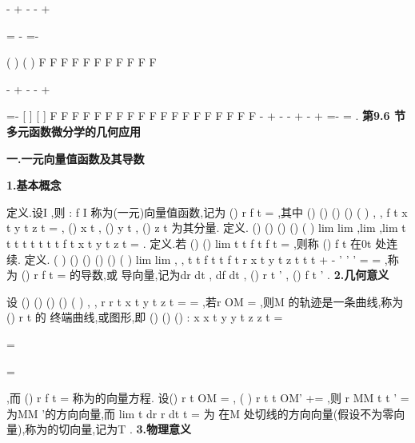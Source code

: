 \partial 
\partial 
-
+
-
-
+






\partial 
\partial 
\partial 
\partial 




=
-
=-


\partial \partial 
\partial 

(
)
(
)
F
F
F
F
F
F
F
F
F
F
F




-
+
\cdots 
-
-
+
\cdots 








=-
[
]
[
]
F F
F F F
F
F F
F F
F F
F F F
F F
F
F
-
+
-
-
+
-
+
=-
=
. 
\vspace{6pt}
{\large \bfseries \textcolor{lyred}{第9.6 节 多元函数微分学的几何应用}}

\vspace{4pt}
{\bfseries \textcolor{lyred}{一.一元向量值函数及其导数}}

{\bfseries \textcolor{lyred}{1.基本概念}}

\textcolor{lyred}{定义}.设I \subset {},则
:
f
I \to 
\rho 
{}称为\textcolor{lyred}{(一元)向量值函数},记为
()
r
f t
=
\rho 
\rho 
,其中 
()
()
()
()
(
)
,
,
f t
x t
y t
z t
=
\rho 
, ()
x t , ()
y t , ()
z t 为其\textcolor{lyred}{分量}. 
\textcolor{lyred}{定义}.
()
()
()
()
(
)
lim
lim
,lim
,lim
t
t
t
t
t
t
t
t
f t
x t
y t
z t
\to 
\to 
\to 
\to 
=
\rho 
. 
\textcolor{lyred}{定义}.若
()
()
lim
t
t f t
f t
\to 
=
\rho 
\rho 
,则称
()
f t
\rho 
在0t 处\textcolor{lyred}{连续}. 
\textcolor{lyred}{定义}.
(
)
()
()
()
()
(
)
lim
lim
,
,
t
t
f t
t
f t
r
x t
y t
z t
t
t
\Delta \to 
\Delta \to 
+\Delta 
-
\Delta 
'
'
'
=
=
\Delta 
\Delta 
\rho 
\rho 
\rho 
,称为
()
r
f t
=
\rho 
\rho 
的\textcolor{lyred}{导数},或 
\textcolor{lyred}{导向量},记为dr
dt
\rho 
, df
dt
\rho 
,
()
r t
'\rho 
,
()
f
t
'
\rho 
. 
{\bfseries \textcolor{lyred}{2.几何意义}}

设
()
()
()
()
(
)
,
,
r
r t
x t
y t
z t
=
=
\rho 
\rho 
,若r
OM
=
\xi \xi \xi \xi \rho 
\rho 
,则M 的轨迹是一条曲线\Gamma ,称为()
r t
\rho 
的 
\textcolor{lyred}{终端曲线},或\textcolor{lyred}{图形},即
()
()
()
:
x
x t
y
y t
z
z t
=


\Gamma 
=


=

,而
()
r
f t
=
\rho 
\rho 
称为\Gamma 的\textcolor{lyred}{向量方程}. 
设()
r t
OM
=
\xi \xi \xi \xi \rho 
\rho 
, (
)
r t
t
OM'
+\Delta =
\xi \xi \xi \xi \rho 
\rho 
,则
r
MM
t
t
'
\Delta 
=
\Delta 
\Delta 
\xi \xi \xi \xi \xi \rho 
\rho 
为MM '的方向向量,而
lim
t
dr
r
dt
t
\Delta \to 
\Delta 
=
\Delta 
\rho 
\rho 
为 
\Gamma 在M 处切线的方向向量(假设不为零向量),称为\Gamma 的\textcolor{lyred}{切向量},记为T
\rho 
. 
{\bfseries \textcolor{lyred}{3.物理意义}}

